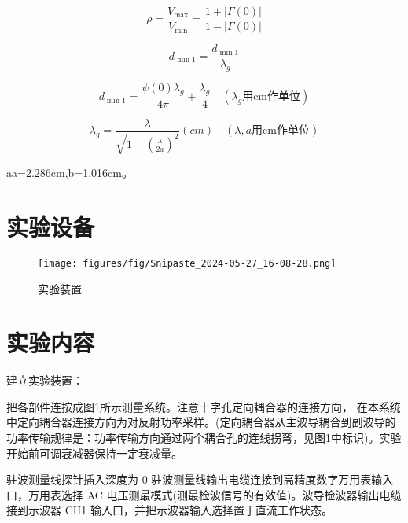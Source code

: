 \documentclass[12pt,hyperref,a4paper,UTF8]{ctexart}
\begin{document}
\begin{equation}
\rho = \frac{V_{\max}}{V_{\min}} = \frac{1 + |\Gamma (0)|}{1 - |\Gamma (0)|} \tag{式 4-5}
\end{equation}

\begin{equation}
d_{\min 1} = \frac{d_{\min 1}}{\lambda_g} \tag{式 4-6}
\end{equation}

\begin{equation}
d_{\min 1} = \frac{\psi(0)\lambda_g}{4 \pi} + \frac{\lambda_g}{4} \quad (\lambda_g \text{用} \text{cm} \text{作单位}) \tag{式 4-7}
\end{equation}

\begin{equation}
\lambda_{g}=\frac{\lambda}{\sqrt{1-(\frac{\lambda}{2a})^{2}}} (cm)\quad(\lambda,a\text{用}\text{cm} \text{作单位}) \tag{式 4-8}
\end{equation}

aa=2.286cm,b=1.016cm。

\newpage







\section{实验设备}
    \begin{figure}[H]
        \centering
        \texttt{[image: figures/fig/Snipaste\_2024-05-27\_16-08-28.png]}
        \caption{实验装置}
        \label{fig:enter-label}
    \end{figure}



\section{实验内容}
建立实验装置：

把各部件连按成图1所示测量系统。注意十字孔定向耦合器的连接方向， 在本系统中定向耦合器连接方向为对反射功率采样。(定向耦合器从主波导耦合到副波导的功率传输规律是：功率传输方向通过两个耦合孔的连线拐弯，见图1中标识)。实验开始前可调衰减器保持一定衰减量。

驻波测量线探针插入深度为 0 驻波测量线输出电缆连接到高精度数字万用表输入口，万用表选择 AC 电压测最模式(测最检波信号的有效值)。波导检波器输出电缆接到示波器 CH1 输入口，并把示波器输入选择置于直流工作状态。
\end{document}
